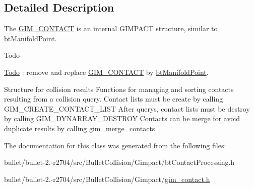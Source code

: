\subsection{Detailed Description}
The \hyperlink{class_g_i_m___c_o_n_t_a_c_t}{G\+I\+M\+\_\+\+C\+O\+N\+T\+A\+C\+T} is an internal G\+I\+M\+P\+A\+C\+T structure, similar to \hyperlink{classbt_manifold_point}{bt\+Manifold\+Point}. \begin{DoxyRefDesc}{Todo}
\item[\hyperlink{todo__todo000035}{Todo}]\+: remove and replace \hyperlink{class_g_i_m___c_o_n_t_a_c_t}{G\+I\+M\+\_\+\+C\+O\+N\+T\+A\+C\+T} by \hyperlink{classbt_manifold_point}{bt\+Manifold\+Point}. \end{DoxyRefDesc}


Structure for collision results Functions for managing and sorting contacts resulting from a collision query. Contact lists must be create by calling G\+I\+M\+\_\+\+C\+R\+E\+A\+T\+E\+\_\+\+C\+O\+N\+T\+A\+C\+T\+\_\+\+L\+I\+S\+T After querys, contact lists must be destroy by calling G\+I\+M\+\_\+\+D\+Y\+N\+A\+R\+R\+A\+Y\+\_\+\+D\+E\+S\+T\+R\+O\+Y Contacts can be merge for avoid duplicate results by calling gim\+\_\+merge\+\_\+contacts 

The documentation for this class was generated from the following files\+:\begin{DoxyCompactItemize}
\item 
bullet/bullet-\/2.-\/r2704/src/\+Bullet\+Collision/\+Gimpact/bt\+Contact\+Processing.\+h\item 
bullet/bullet-\/2.-\/r2704/src/\+Bullet\+Collision/\+Gimpact/\hyperlink{gim__contact_8h}{gim\+\_\+contact.\+h}\end{DoxyCompactItemize}
